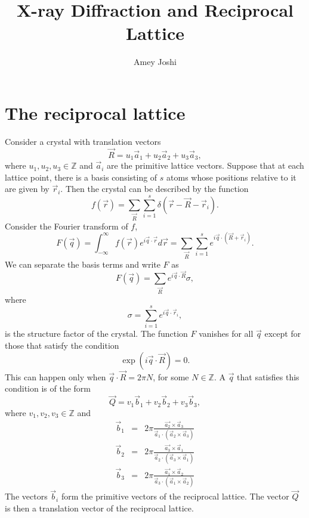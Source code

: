 \documentclass{article}
\title{X-ray Diffraction and Reciprocal Lattice}
\begin{document}
\author{Amey Joshi}
\maketitle
\section{The reciprocal lattice}
Consider a crystal with translation vectors
\begin{equation}\label{e1}
\vec{R} = u_1\vec{a}_1 + u_2\vec{a}_2 + u_3\vec{a}_3,
\end{equation}
where $u_1, u_2, u_3 \in \mathbb{Z}$ and $\vec{a}_i$ are the primitive lattice 
vectors. Suppose that at each lattice point, there is a basis consisting of $s$
atoms whose positions relative to it are given by $\vec{r}_i$. Then the crystal
can be described by the function
\begin{equation}\label{e2}
f(\vec{r}) = \sum_{\vec{R}}\sum_{i=1}^s \delta(\vec{r} - \vec{R} - \vec{r}_i).
\end{equation}
Consider the Fourier transform of $f$,
\begin{equation}\label{e3}
F(\vec{q}) = \int_{-\infty}^\infty f(\vec{r})e^{i\vec{q}\cdot\vec{r}}d\vec{r}
= \sum_{\vec{R}}\sum_{i=1}^se^{i\vec{q}\cdot(\vec{R} + \vec{r}_i)}.
\end{equation}
We can separate the basis terms and write $F$ as
\begin{equation}\label{e4}
F(\vec{q}) = \sum_{\vec{R}}e^{i\vec{q}\cdot\vec{R}}\sigma,
\end{equation}
where
\begin{equation}\label{e5}
\sigma = \sum_{i=1}^s e^{i\vec{q}\cdot\vec{r}_i},
\end{equation}
is the structure factor of the crystal.
The function $F$ vanishes for all $\vec{q}$ except for those that satisfy the
condition
\begin{equation}\label{e6}
\exp(i\vec{q}\cdot\vec{R}) = 0.
\end{equation}
This can happen only when $\vec{q}\cdot\vec{R} = 2\pi N$, for some $N \in
\mathbb{Z}$. A $\vec{q}$ that satisfies this condition is of the form
\begin{equation}\label{e7}
\vec{Q} = v_1\vec{b}_1 + v_2\vec{b}_2 + v_3\vec{b}_3,
\end{equation}
where $v_1, v_2, v_3 \in \mathbb{Z}$ and 
\begin{eqnarray}
\vec{b}_1 &=& 2\pi\frac{\vec{a_2}\times\vec{a}_3}
{\vec{a}_1\cdot(\vec{a}_2\times\vec{a}_3)} \label{e8} \\
\vec{b}_2 &=& 2\pi\frac{\vec{a_3}\times\vec{a}_1}
{\vec{a}_2\cdot(\vec{a}_3\times\vec{a}_1)} \label{e9} \\
\vec{b}_3 &=& 2\pi\frac{\vec{a_1}\times\vec{a}_2}
{\vec{a}_3\cdot(\vec{a}_1\times\vec{a}_2)} \label{e10} 
\end{eqnarray}
The vectors $\vec{b}_i$ form the primitive vectors of the reciprocal lattice.
The vector $\vec{Q}$ is then a translation vector of the reciprocal lattice.
\end{document}
